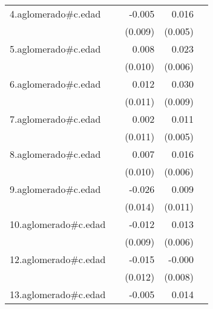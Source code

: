 {\begin{longtable}{l*{4}{D{.}{.}{-1}}}
\addlinespace
4.aglomerado#c.edad&                     &      -0.005         &       0.016\sym{**} &                     \\
            &                     &     (0.009)         &     (0.005)         &                     \\
\addlinespace
5.aglomerado#c.edad&                     &       0.008         &       0.023\sym{***}&                     \\
            &                     &     (0.010)         &     (0.006)         &                     \\
\addlinespace
6.aglomerado#c.edad&                     &       0.012         &       0.030\sym{***}&                     \\
            &                     &     (0.011)         &     (0.009)         &                     \\
\addlinespace
7.aglomerado#c.edad&                     &       0.002         &       0.011\sym{*}  &                     \\
            &                     &     (0.011)         &     (0.005)         &                     \\
\addlinespace
8.aglomerado#c.edad&                     &       0.007         &       0.016\sym{**} &                     \\
            &                     &     (0.010)         &     (0.006)         &                     \\
\addlinespace
9.aglomerado#c.edad&                     &      -0.026         &       0.009         &                     \\
            &                     &     (0.014)         &     (0.011)         &                     \\
\addlinespace
10.aglomerado#c.edad&                     &      -0.012         &       0.013\sym{*}  &                     \\
            &                     &     (0.009)         &     (0.006)         &                     \\
\addlinespace
12.aglomerado#c.edad&                     &      -0.015         &      -0.000         &                     \\
            &                     &     (0.012)         &     (0.008)         &                     \\
\addlinespace
13.aglomerado#c.edad&                     &      -0.005         &       0.014\sym{***}&                     \\

\end{longtable}}
